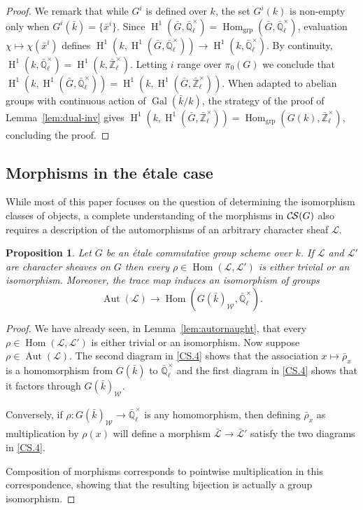 \documentclass[10pt]{amsart}
\theoremstyle{plain}
\newtheorem{proposition}[theorem]{Proposition}
\theoremstyle{definition}
\theoremstyle{remark}
\newcommand{\EE}{\mathbb{\bar Q}_\ell}
\newcommand{\bFq}{\bar{k}}
\newcommand{\Fq}{k}
\newcommand{\EEx}{\EE^\times}
\newcommand{\Weil}[1]{\mathcal{W}_{#1}}
\DeclareMathOperator{\Gal}{Gal}
\DeclareMathOperator{\Aut}{Aut}
\DeclareMathOperator{\Hom}{Hom}
\DeclareMathOperator{\Hh}{H}
\newcommand{\cs}[1]{{\mathcal{#1}}}
\newcommand{\gcs}[1]{{\mathcal{\bar #1}}}
\newcommand{\CS}{{\mathcal{C\hskip-0.8pt S}}}
\newcommand{\brho}{{\bar\rho}}
\begin{document}
\begin{proof}
We remark that while $G^i$ is defined over $\Fq$, the set $G^i(\Fq)$ is non-empty only when $G^i(\bFq) = \{ {\bar x}^i\}$.
Since $\Hh^1({\bar G},\EEx) = \Hom_\text{grp}({\bar G},\EEx)$, evaluation $\chi \mapsto \chi({\bar x}^i)$ defines $\Hh^1(\Fq,\Hh^1({\bar G},\EEx)) \to \Hh^1(\Fq,\EEx)$. 
By continuity, $\Hh^1(\Fq,\EEx) = \Hh^1(\Fq,\mathbb{\bar Z}_{\ell}^\times)$.
Letting $i$ range over $\pi_0(G)$ we conclude that $\Hh^1(\Fq,\Hh^1({\bar G},\EEx)) = \Hh^1(\Fq,\Hh^1({\bar G},\mathbb{\bar Z}_{\ell}^\times))$.
When adapted to abelian groups with continuous action of $\Gal(\bFq/\Fq)$, the strategy of the proof of Lemma~\ref{lem:dual-inv} gives $\Hh^1(\Fq,\Hh^1({\bar G},\mathbb{\bar Z}_{\ell}^\times)) =  \Hom_\text{grp}(G(\Fq),\mathbb{\bar Z}_{\ell}^\times)$, concluding the proof.
\end{proof}

\subsection{Morphisms in the \'etale case}\label{ssec:mor-etale}

While most of this paper focuses on the question of determining the isomorphism classes of objects, a complete understanding of the morphisms in $\CS(G)$ also requires a description of the automorphisms of an arbitrary character sheaf $\cs{L}$.

\begin{proposition}\label{prop:autornaught_etale}
Let $G$ be an \'etale commutative group scheme over $\Fq$.
If $\cs{L}$ and $\cs{L}'$ are character sheaves on $G$ then
every $\rho\in \Hom(\cs{L},\cs{L}')$ is either trivial or an isomorphism. Moreover, the trace map induces an isomorphism of groups
\[
\Aut(\cs{L}) \to \Hom(G(\bFq)_{\Weil{}}, \EEx).
\]
\end{proposition}

\begin{proof}
We have already seen, in Lemma~\ref{lem:autornaught}, that every $\rho\in \Hom(\cs{L},\cs{L}')$ is either trivial or an isomorphism.
Now suppose $\rho \in \Aut(\cs{L})$.
The second diagram in \ref{CS.4} shows that the association $x \mapsto \brho_x$ is a homomorphism from $G(\bFq)$ to $\EEx$ and the first diagram in \ref{CS.4} shows that it factors through $G(\bFq)_{\Weil{}}$.  

Conversely, if $\rho : G(\bFq)_{\Weil{}} \to \EEx$ is any homomorphism, then defining $\brho_x$ as multiplication by $\rho(x)$ will define a morphism $\gcs{L} \to \gcs{L}'$ satisfy the two diagrams in \ref{CS.4}.  

Composition of morphisms corresponds to pointwise multiplication in this correspondence, showing that the resulting bijection is actually a group isomorphism.
\end{proof}
\end{document}
